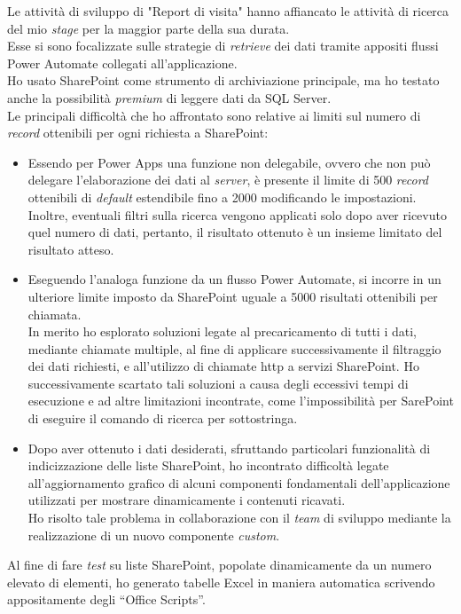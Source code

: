 Le attività di sviluppo di "Report di visita" hanno affiancato le attività di ricerca del mio \emph{stage} per la maggior parte della sua durata.\\
Esse si sono focalizzate sulle strategie di \emph{retrieve} dei dati tramite appositi flussi Power Automate collegati all'applicazione.\\
Ho usato SharePoint come strumento di archiviazione principale, ma ho testato anche la possibilità \emph{premium} di leggere dati da SQL Server.\\
Le principali difficoltà che ho affrontato sono relative ai limiti sul numero di \emph{record} ottenibili per ogni richiesta a SharePoint:
\begin{itemize}
    \item Essendo per Power Apps una funzione non delegabile, ovvero che non può delegare l'elaborazione dei dati al \emph{server}, è presente il limite di 500 \emph{record} ottenibili di \emph{default} estendibile fino a 2000 modificando le impostazioni.
    Inoltre, eventuali filtri sulla ricerca vengono applicati solo dopo aver ricevuto quel numero di dati, pertanto, il risultato ottenuto è un insieme limitato del risultato atteso.
    \item Eseguendo l'analoga funzione da un flusso Power Automate, si incorre in un ulteriore limite imposto da SharePoint uguale a 5000 risultati ottenibili per chiamata.\\
    In merito ho esplorato soluzioni legate al precaricamento di tutti i dati, mediante chiamate multiple, al fine di applicare successivamente il filtraggio dei dati richiesti, e all'utilizzo di chiamate \gls{http} a servizi SharePoint.
    Ho successivamente scartato tali soluzioni a causa degli eccessivi tempi di esecuzione e ad altre limitazioni incontrate, come l'impossibilità per SarePoint di eseguire il comando di ricerca per sottostringa.
    \item Dopo aver ottenuto i dati desiderati, sfruttando particolari funzionalità di indicizzazione delle liste SharePoint, ho incontrato difficoltà legate all'aggiornamento grafico di alcuni componenti fondamentali dell'applicazione utilizzati per mostrare dinamicamente i contenuti ricavati.\\
    Ho risolto tale problema in collaborazione con il \emph{team} di sviluppo mediante la realizzazione di un nuovo componente \emph{custom}.  
\end{itemize}
Al fine di fare \emph{test} su liste SharePoint, popolate dinamicamente da un numero elevato di elementi, ho generato tabelle Excel in maniera automatica scrivendo appositamente degli “Office Scripts”.\\

